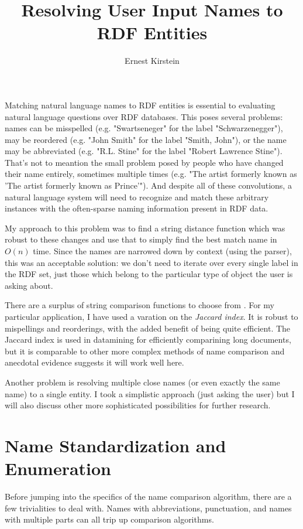 \documentclass[11pt]{article}
\begin{document}
\title{Resolving User Input Names to RDF Entities}
\author{Ernest Kirstein}
\maketitle

Matching natural language names to RDF entities is essential to evaluating
natural language questions over RDF databases. This poses several problems:
names can be misspelled (e.g. "Swartseneger" for the label "Schwarzenegger"), 
may be reordered (e.g. "John Smith" for the label "Smith, John"),
or the name may be abbreviated (e.g. "R.L. Stine" for the label "Robert Lawrence Stine").
That's not to meantion the small problem posed by people who have
changed their name entirely, sometimes multiple times
(e.g. "The artist formerly known as 'The artist formerly known as Prince'").
And despite all of these convolutions, a natural language system will need to
recognize and match these arbitrary instances with the often-sparse naming information
present in RDF data.

My approach to this problem was to find a string distance function which was
robust to these changes and use that to simply
find the best match name in $O(n)$ time. Since the names are narrowed down by
context (using the parser), this was an acceptable solution: we don't need to iterate
over every single label in the RDF set, just those which belong to the particular
type of object the user is asking about.

There are a surplus of string comparison functions to choose from \cite{comparison}.
For my particular application, I have used a varation on the {\em Jaccard index}.
It is robust to mispellings and reorderings, with the added benefit of being quite efficient.
The Jaccard index is used in datamining for efficiently comparining long documents,
but it is comparable to other more complex methods of name comparison \cite{comparison} and 
anecdotal evidence suggests it will work well here.

Another problem is resolving multiple close names (or even exactly the same name) to a single entity.
I took a simplistic approach (just asking the user) but I will also discuss other more
sophisticated possibilities for further research. 

\section{Name Standardization and Enumeration}
Before jumping into the specifics of the name comparison algorithm, there are a few trivialities
to deal with. Names with abbreviations, punctuation, and names with multiple parts can all
trip up comparison algorithms.
\end{document}
